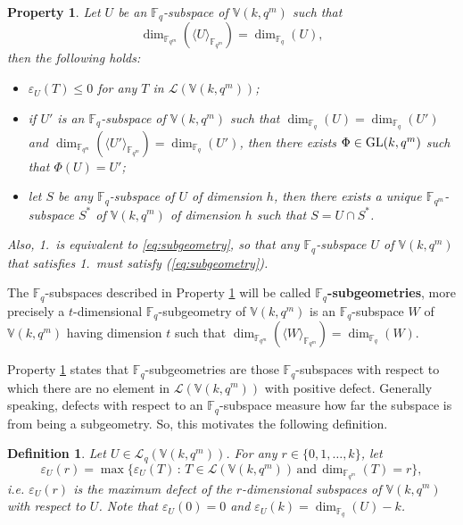 \documentclass[11pt]{amsart}
\newtheorem{definition}[theorem]{Definition}
\newtheorem{property}[theorem]{Property}
\newcommand{\fqm}{\mathbb{F}_{q^m}}
\newcommand{\GL}{\hbox{{\rm GL}}}
\newcommand{\fq}{{\mathbb F}_{q}}
\begin{document}
\begin{property}\label{prop:subgeometry}
Let $U$ be an $\fq$-subspace of $\mathbb{V}(k,q^m)$ such that 
\begin{equation}\label{eq:subgeometry}
\dim_{\fqm}(\langle U\rangle_{\fqm})=\dim_{\fq} (U),
\end{equation}
then the following holds:
\begin{itemize}
    \item[1.] $\varepsilon_U(T)\leq 0$ for any $T$ in  ${\mathcal L}(\mathbb{V}(k,q^m))$; 
    \item[2.] if $U'$ is an $\fq$-subspace of  $\mathbb{V}(k,q^m)$ such that $\dim_{\fq} (U)=\dim_{\fq}(U')$  and $\dim_{\fqm}(\langle U'\rangle_{\fqm})=\dim_{\fq}(U')$, then there exists $\Phi \in \GL(k,q^m)$ such that $\Phi(U)=U'$;
    \item[3.] let $S$ be any $\fq$-subspace  of $U$ of dimension $h$, then there exists a unique $\fqm$-subspace $S^*$ of $\mathbb{V}(k,q^m)$ of dimension $h$ such that $S=U\cap S^*$.
\end{itemize}
Also, 1.\ is equivalent to \eqref{eq:subgeometry}, so that any $\fq$-subspace $U$ of $\mathbb{V}(k,q^m)$ that satisfies  1.\ must satisfy (\ref{eq:subgeometry}). 
\end{property}

The $\fq$-subspaces described in Property \ref{prop:subgeometry} will be called {\bf $\fq$-subgeometries}, more precisely a $t$-dimensional $\fq$-subgeometry of $\mathbb{V}(k,q^m)$ is an $\fq$-subspace $W$ of  $\mathbb{V}(k,q^m)$ having dimension $t$ such that $\dim_{\fqm}(\langle W\rangle_{\fqm})=\dim_{\fq}(W)$. 



Property \ref{prop:subgeometry} states that $\fq$-subgeometries are those $\fq$-subspaces with respect to which there are no element in ${\mathcal L}(\mathbb{V}(k,q^m))$ with positive defect. Generally speaking, defects with respect to an $\fq$-subspace measure how far the subspace is from being a subgeometry. So, this motivates the following definition.

\begin{definition} 
\label{def:maximum_defect} Let $U\in \mathcal{L}_q(\mathbb{V}(k,q^m))$. For any $r\in \{0,1,\dots,k\}$, let
\[\varepsilon_U(r)=\max\{\varepsilon_U(T) \, : \, T\in  {\mathcal L}(\mathbb{V}(k,q^m)) \, \mbox{and} \, \dim_{\fqm} (T)=r\},\]
i.e. $\varepsilon_U(r)$ is the maximum defect of the  $r$-dimensional subspaces of $\mathbb{V}(k,q^m)$ with respect to $U$. Note that $\varepsilon_U(0)=0$ and $\varepsilon_U(k)=\dim_{\fq}(U)-k$. 
\end{definition}
\end{document}
